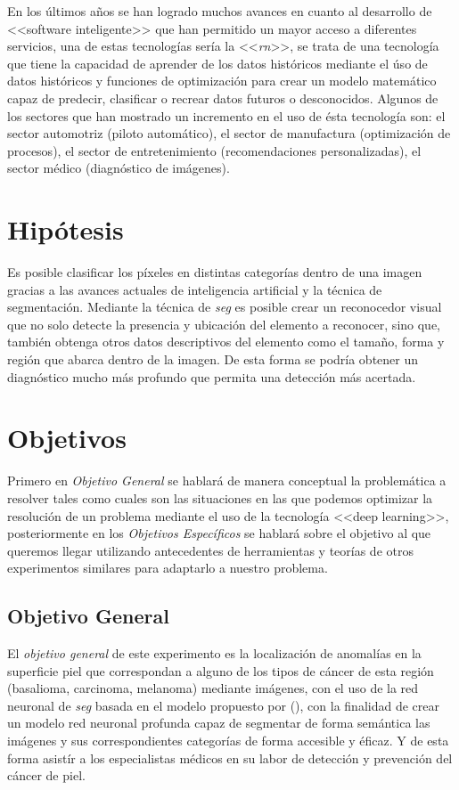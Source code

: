 En los últimos años se han logrado muchos avances en cuanto al desarrollo de <<software inteligente>> que han permitido un mayor acceso a diferentes servicios, una de estas tecnologías sería la <<\emph{\gls{rn}}>>, se trata de una tecnología que tiene la capacidad de aprender de los datos históricos mediante el úso de datos históricos y funciones de optimización para crear un modelo matemático capaz de predecir, clasificar o recrear datos futuros o desconocidos. Algunos de los sectores que han mostrado un incremento en el uso de ésta tecnología son: el sector automotriz (piloto automático), el sector de manufactura (optimización de procesos), el sector de entretenimiento (recomendaciones personalizadas), el sector médico (diagnóstico de imágenes). 


\section{Hipótesis}
Es posible clasificar los píxeles en distintas categorías dentro de una imagen gracias a las avances actuales de inteligencia artificial y la técnica de segmentación. Mediante la técnica de \emph{\gls{seg}} es posible crear un reconocedor visual que no solo detecte la presencia y ubicación del elemento a reconocer, sino que, también obtenga otros datos descriptivos del elemento como el tamaño, forma y región que abarca dentro de la imagen. De esta forma se podría obtener un diagnóstico mucho más profundo que permita una detección más acertada.

\section{Objetivos}
Primero en \emph{Objetivo General} se hablará de manera conceptual la problemática a resolver tales como cuales son las situaciones en las que podemos optimizar la resolución de un problema mediante el uso de la tecnología <<deep learning>>, posteriormente en los \emph{Objetivos Específicos} se hablará sobre el objetivo al que queremos llegar utilizando antecedentes de herramientas y teorías de otros experimentos similares para adaptarlo a nuestro problema.

\subsection{Objetivo General}
El \emph{objetivo general} de este experimento es la localización de anomalías en la superficie piel que correspondan a alguno de los tipos de cáncer de esta región (basalioma, carcinoma, melanoma) mediante imágenes, con el uso de la red neuronal de \emph{\gls{seg}} basada en el modelo propuesto por \citeauthor*{wu2019fastfcn} (\citeyear{wu2019fastfcn}), con la finalidad de crear un modelo red neuronal profunda capaz de segmentar de forma semántica las imágenes y sus correspondientes categorías de forma accesible y éficaz. Y de esta forma asistír a los especialistas médicos en su labor de detección y prevención del cáncer de piel.

